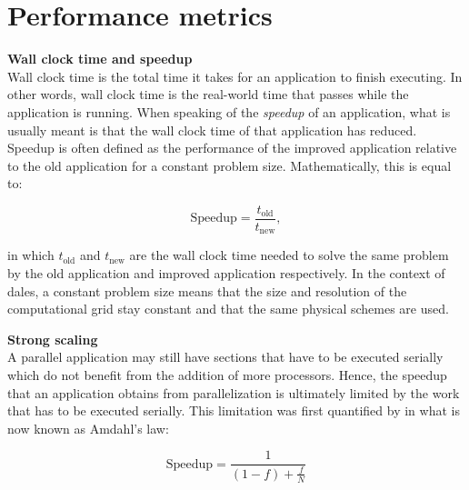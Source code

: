 \section{Performance metrics}

\noindent \textbf{Wall clock time and speedup} \\
Wall clock time is the total time it takes for an application to finish executing. In other words, wall clock time is the real-world time that passes while the application is running. When speaking of the \emph{speedup} of an application, what is usually meant is that the wall clock time of that application has reduced. Speedup is often defined as the performance of the improved application relative to the old application for a constant problem size. Mathematically, this is equal to:

\begin{equation}
    \text{Speedup} = \frac{t_{\text{old}}}{t_{\text{new}}},
    \label{eq:speedup}
\end{equation}

in which $t_{\text{old}}$ and $t_{\text{new}}$ are the wall clock time needed to solve the same problem by the old application and improved application respectively. In the context of \acrshort{dales}, a constant problem size means that the size and resolution of the computational grid stay constant and that the same physical schemes are used.

\medskip

\noindent \textbf{Strong scaling} \\
A parallel application may still have sections that have to be executed serially which do not benefit from the addition of more processors. Hence, the speedup that an application obtains from parallelization is ultimately limited by the work that has to be executed serially. This limitation was first quantified by \citet{amdahlValiditySingleProcessor1967} in what is now known as Amdahl's law: 

\begin{equation}
    \text{Speedup} = \frac{1}{(1-f) + \displaystyle \frac{f}{N}}
    \label{eq:amdahls_law}
\end{equation}

